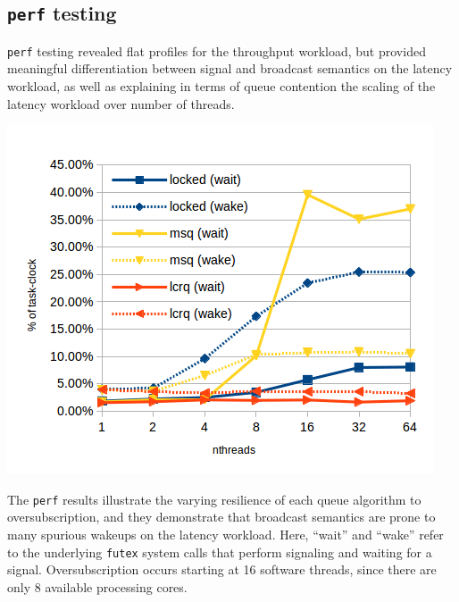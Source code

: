 \documentclass[twoside,10pt]{article}
\newenvironment{Figure}
  {\par\medskip\noindent\minipage{\linewidth}}
  {\endminipage\par\medskip}
\begin{document}
\begin{multicols}{2}
\subsection{\texttt{perf} testing}

\verb+perf+ testing revealed flat profiles for the throughput
workload, but provided meaningful differentiation between signal and
broadcast semantics on the latency workload, as well as explaining in
terms of queue contention the scaling of the latency workload over
number of threads.


\begin{Figure}
\includegraphics[width=\linewidth]{img/perf-latency-nthreads.png}
\label{fig:perf-latency-nthreads}
\end{Figure}

The \verb+perf+ results illustrate the varying resilience of each
queue algorithm to oversubscription, and they demonstrate that
broadcast semantics are prone to many spurious wakeups on the latency
workload. Here, ``wait'' and ``wake'' refer to the underlying
\verb+futex+ system calls that perform signaling and waiting for a
signal. Oversubscription occurs starting at 16 software threads, since
there are only 8 available processing cores. 


\end{multicols}
\end{document}
